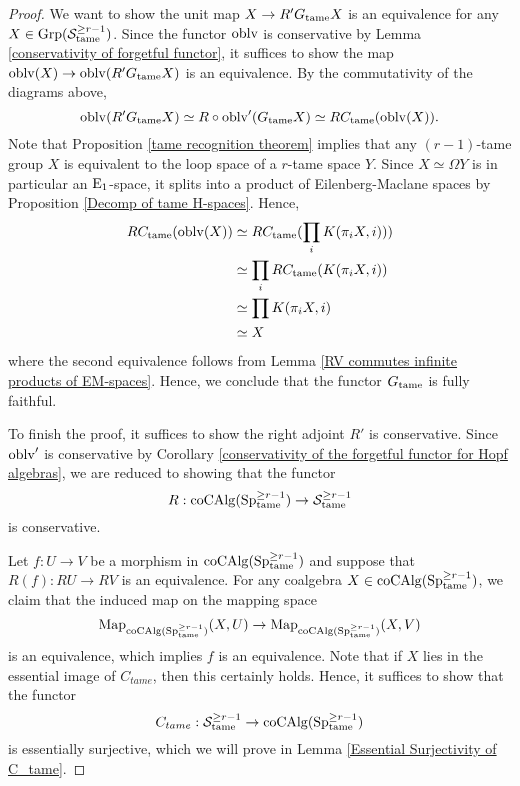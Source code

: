 \begin{proof}
We want to show the unit map $X \to R' G_{\operatorname{\operatorname{tame}}}X$ is an equivalence for any $X\in \operatorname{Grp}({\mathcal{S}}^{\geq r-1}_{\operatorname{\operatorname{tame}}})$.
Since the functor $\operatorname{oblv}$ is conservative by Lemma \ref{conservativity of forgetful functor}, it suffices to show the map $\operatorname{oblv}(X) \to \operatorname{oblv}(R'G_{\operatorname{\operatorname{tame}}}X)$ is an equivalence.
By the commutativity of the diagrams above, 
$$
\operatorname{oblv}(R'G_{\operatorname{\operatorname{tame}}}X) \simeq R \circ \operatorname{oblv}'(G_{\operatorname{\operatorname{tame}}}X)\simeq RC_{\operatorname{\operatorname{tame}}}(\operatorname{oblv}(X)).
$$
	Note that Proposition \ref{tame recognition theorem} implies that any  $(r-1)$-tame group $X$ is equivalent to the loop space of a $r$-tame space $Y$. Since $X\simeq \Omega Y$ is in particular an $\operatorname{E}_1$-space, it splits into a product of Eilenberg-Maclane spaces by Proposition \ref{Decomp of tame H-spaces}. Hence, 
		\begin{align*}
		RC_{\operatorname{\operatorname{tame}}}(\operatorname{oblv}(X)) & \simeq RC_{\operatorname{\operatorname{tame}}}(\prod_{i} K(\pi_i X, i)))\\
		& \simeq \prod_{i} RC_{\operatorname{\operatorname{tame}}}(K(\pi_i X, i))\\
		& \simeq \prod K(\pi_i X, i)\\
		& \simeq X
	\end{align*}
	where the second equivalence follows from Lemma \ref{RV commutes infinite products of EM-spaces}.
	Hence, we conclude that the functor $G_{\operatorname{\operatorname{tame}}}$ is fully faithful.
	
	To finish the proof, it suffices to show the right adjoint $R'$ is conservative. 
	Since $\operatorname{oblv}'$ is conservative by Corollary \ref{conservativity of the forgetful functor for Hopf algebras}, we are reduced to showing that the functor 
	\[
	R: \operatorname{coCAlg}(\operatorname{Sp}^{\geq r-1}_{\operatorname{\operatorname{tame}}}) \to 
	{\mathcal{S}}^{\geq r-1}_{\operatorname{\operatorname{tame}}}
	\]
	is conservative.
	
	Let $f:U\to V$ be a morphism in $\operatorname{coCAlg}(\operatorname{Sp}^{\geq r-1}_{\operatorname{\operatorname{tame}}})$ and suppose that $R(f): RU\to RV$ is an equivalence.
	For any coalgebra $X\in \operatorname{coCAlg}(\operatorname{Sp}^{\geq r-1}_{\operatorname{\operatorname{tame}}})$, we claim that the induced map on the mapping space
	$$
	\operatorname{Map}_{\operatorname{coCAlg}(\operatorname{Sp}^{\geq r-1}_{\operatorname{\operatorname{tame}}})}(X, U)\to 
	\operatorname{Map}_{\operatorname{coCAlg}(\operatorname{Sp}^{\geq r-1}_{\operatorname{\operatorname{tame}}})}(X, V)
	$$
	is an equivalence, which implies $f$ is an equivalence.
	Note that if $X$ lies in the essential image of $C_{tame}$, then this certainly holds. Hence, it suffices to show that the functor
	$$
	C_{tame}: {\mathcal{S}}^{\geq r-1}_{\operatorname{\operatorname{tame}}}  
	\to 
	\operatorname{coCAlg}(\operatorname{Sp}^{\geq r-1}_{\operatorname{\operatorname{tame}}})
	$$
	is essentially surjective, which we will prove in Lemma \ref{Essential Surjectivity of C_tame}.
	
\end{proof}

